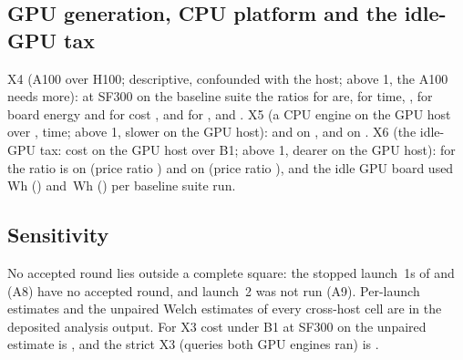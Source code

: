 \documentclass[sigconf]{acmart}
\begin{document}
\subsection{GPU generation, CPU platform and the idle-GPU tax}
\label{sec:results-x456}
X4 (A100 over H100; descriptive, confounded with the host; above 1, the A100 needs more): at SF300 on
the baseline suite the ratios for
\polarsgpu{} are, for time, , for board energy
 and for cost
, and for \sparkgpu{}
,  and
. X5 (a CPU engine on the GPU host over \CG, time; above 1, slower on the GPU host): \polarscpu{}
 and \sparkcpu{}  on \GH,
 and  on \GA. X6 (the
idle-GPU tax: cost on the GPU host over B1; above 1, dearer on the GPU host): for \polarscpu{} the ratio is
 on \GH{} (price ratio
) and
 on \GA{} (price ratio
), and the idle GPU board used
\,Wh (\GH) and
\,Wh (\GA) per baseline suite run.

\subsection{Sensitivity}
\label{sec:results-sens}
No accepted round lies outside a complete square: the stopped launch~1s of \CV{} and \CG{} (A8)
have no accepted round, and \CG{} launch~2 was not run (A9). Per-launch estimates and the unpaired Welch estimates of every cross-host cell are in the
deposited analysis output. For X3 cost under B1 at SF300 on \GH{} the unpaired estimate is
, and the strict X3 (queries both GPU engines
ran) is .

\end{document}
